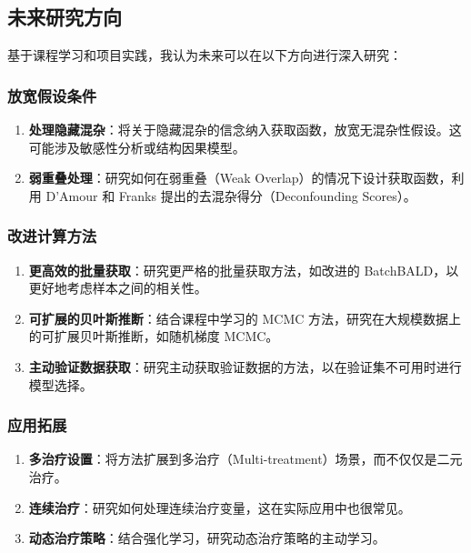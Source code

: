 \documentclass[12pt]{article}
\begin{document}
\subsection{未来研究方向}

基于课程学习和项目实践，我认为未来可以在以下方向进行深入研究：

\subsubsection{放宽假设条件}

\begin{enumerate}
\item \textbf{处理隐藏混杂}：将关于隐藏混杂的信念纳入获取函数，放宽无混杂性假设。这可能涉及敏感性分析或结构因果模型。

\item \textbf{弱重叠处理}：研究如何在弱重叠（Weak Overlap）的情况下设计获取函数，利用 D'Amour 和 Franks 提出的去混杂得分（Deconfounding Scores）。
\end{enumerate}

\subsubsection{改进计算方法}

\begin{enumerate}
\item \textbf{更高效的批量获取}：研究更严格的批量获取方法，如改进的 BatchBALD，以更好地考虑样本之间的相关性。

\item \textbf{可扩展的贝叶斯推断}：结合课程中学习的 MCMC 方法，研究在大规模数据上的可扩展贝叶斯推断，如随机梯度 MCMC。

\item \textbf{主动验证数据获取}：研究主动获取验证数据的方法，以在验证集不可用时进行模型选择。
\end{enumerate}

\subsubsection{应用拓展}

\begin{enumerate}
\item \textbf{多治疗设置}：将方法扩展到多治疗（Multi-treatment）场景，而不仅仅是二元治疗。

\item \textbf{连续治疗}：研究如何处理连续治疗变量，这在实际应用中也很常见。

\item \textbf{动态治疗策略}：结合强化学习，研究动态治疗策略的主动学习。
\end{enumerate}
\end{document}
